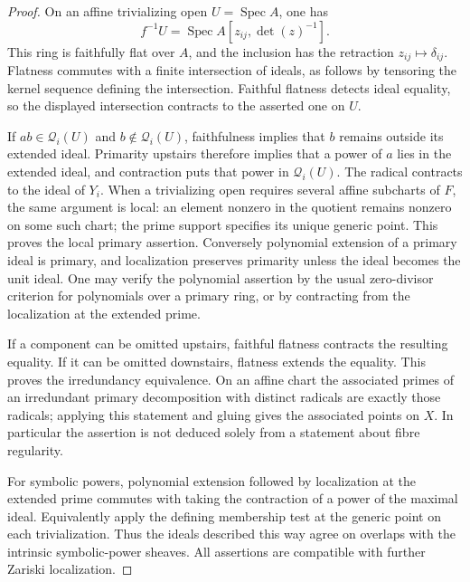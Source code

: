 \begin{proof}
On an affine trivializing open $U=\operatorname{Spec}A$, one has
\[
 f^{-1}U=\operatorname{Spec}A[z_{ij},\det(z)^{-1}].
\]
This ring is faithfully flat over $A$, and the inclusion has the
retraction $z_{ij}\mapsto\delta_{ij}$. Flatness commutes with a
finite intersection of ideals, as follows by tensoring the kernel
sequence defining the intersection. Faithful flatness detects ideal
equality, so the displayed intersection contracts to the asserted
one on $U$.

If $ab\in\mathcal Q_i(U)$ and $b\notin\mathcal Q_i(U)$,
faithfulness implies that $b$ remains outside its extended ideal.
Primarity upstairs therefore implies that a power of $a$ lies in
the extended ideal, and contraction puts that power in
$\mathcal Q_i(U)$. The radical contracts to the ideal of $Y_i$.
When a trivializing open requires several affine subcharts of $F$,
the same argument is local: an element nonzero in the quotient
remains nonzero on some such chart; the prime support specifies its
unique generic point. This proves the local primary assertion.
Conversely polynomial extension of a primary ideal is primary, and
localization preserves primarity unless the ideal becomes the unit
ideal. One may verify the polynomial assertion by the usual
zero-divisor criterion for polynomials over a primary ring, or by
contracting from the localization at the extended prime.

If a component can be omitted upstairs, faithful flatness contracts
the resulting equality. If it can be omitted downstairs, flatness
extends the equality. This proves the irredundancy equivalence.
On an affine chart the associated primes of an irredundant primary
decomposition with distinct radicals are exactly those radicals;
applying this statement and gluing gives the associated points on
$X$. In particular the assertion is not deduced solely from a
statement about fibre regularity.

For symbolic powers, polynomial extension followed by localization
at the extended prime commutes with taking the contraction of a
power of the maximal ideal. Equivalently apply the defining
membership test at the generic point on each trivialization.
Thus the ideals described this way agree on overlaps with the
intrinsic symbolic-power sheaves. All assertions are compatible
with further Zariski localization.
\end{proof}

